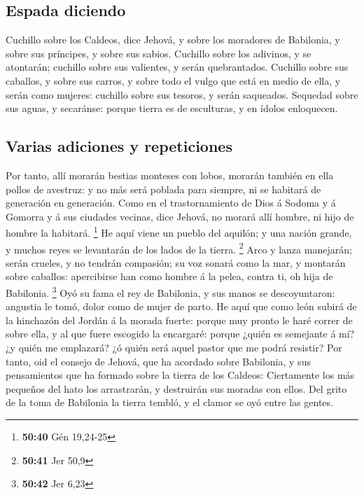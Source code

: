 \hypertarget{espada-diciendo}{%
\subsection{Espada diciendo}\label{espada-diciendo}}

 Cuchillo sobre los Caldeos, dice Jehová, y sobre los
moradores de Babilonia, y sobre sus príncipes, y sobre sus sabios.
 Cuchillo sobre los adivinos, y se atontarán; cuchillo
sobre sus valientes, y serán quebrantados.  Cuchillo sobre
sus caballos, y sobre sus carros, y sobre todo el vulgo que está en
medio de ella, y serán como mujeres: cuchillo sobre sus tesoros, y serán
saqueados.  Sequedad sobre sus aguas, y secaránse: porque
tierra es de esculturas, y en ídolos enloquecen.

\hypertarget{varias-adiciones-y-repeticiones}{%
\subsection{Varias adiciones y
repeticiones}\label{varias-adiciones-y-repeticiones}}

 Por tanto, allí morarán bestias monteses con lobos,
morarán también en ella pollos de avestruz: y no más será poblada para
siempre, ni se habitará de generación en generación.  Como
en el trastornamiento de Dios á Sodoma y á Gomorra y á sus ciudades
vecinas, dice Jehová, no morará allí hombre, ni hijo de hombre la
habitará. \footnote{\textbf{50:40} Gén 19,24-25}  He aquí
viene un pueblo del aquilón; y una nación grande, y muchos reyes se
levantarán de los lados de la tierra. \footnote{\textbf{50:41} Jer 50,9}
 Arco y lanza manejarán; serán crueles, y no tendrán
compasión; su voz sonará como la mar, y montarán sobre caballos:
apercibirse han como hombre á la pelea, contra ti, oh hija de Babilonia.
\footnote{\textbf{50:42} Jer 6,23}  Oyó su fama el rey de
Babilonia, y sus manos se descoyuntaron: angustia le tomó, dolor como de
mujer de parto.  He aquí que como león subirá de la
hinchazón del Jordán á la morada fuerte: porque muy pronto le haré
correr de sobre ella, y al que fuere escogido la encargaré: porque
¿quién es semejante á mí? ¿y quién me emplazará? ¿ó quién será aquel
pastor que me podrá resistir?  Por tanto, oid el consejo de
Jehová, que ha acordado sobre Babilonia, y sus pensamientos que ha
formado sobre la tierra de los Caldeos: Ciertamente los más pequeños del
hato los arrastrarán, y destruirán sus moradas con ellos. 
Del grito de la toma de Babilonia la tierra tembló, y el clamor se oyó
entre las gentes.

